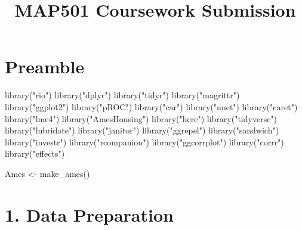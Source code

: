 \documentclass[
]{article}
\title{MAP501 Coursework Submission}
\author{}
\date{\vspace{-2.5em}}
\newenvironment{Shaded}{\begin{snugshade}}{\end{snugshade}}
\newcommand{\FunctionTok}[1]{\textcolor[rgb]{0.00,0.00,0.00}{#1}}
\newcommand{\NormalTok}[1]{#1}
\newcommand{\OtherTok}[1]{\textcolor[rgb]{0.56,0.35,0.01}{#1}}
\newcommand{\StringTok}[1]{\textcolor[rgb]{0.31,0.60,0.02}{#1}}
\begin{document}
\maketitle

{
\setcounter{tocdepth}{2}
\tableofcontents
}
\hypertarget{preamble}{%
\section{Preamble}\label{preamble}}

\begin{Shaded}
\begin{Highlighting}[]
\FunctionTok{library}\NormalTok{(}\StringTok{"rio"}\NormalTok{)}
\FunctionTok{library}\NormalTok{(}\StringTok{"dplyr"}\NormalTok{)}
\FunctionTok{library}\NormalTok{(}\StringTok{"tidyr"}\NormalTok{)}
\FunctionTok{library}\NormalTok{(}\StringTok{"magrittr"}\NormalTok{)}
\FunctionTok{library}\NormalTok{(}\StringTok{"ggplot2"}\NormalTok{)}
\FunctionTok{library}\NormalTok{(}\StringTok{"pROC"}\NormalTok{)}
\FunctionTok{library}\NormalTok{(}\StringTok{"car"}\NormalTok{)}
\FunctionTok{library}\NormalTok{(}\StringTok{"nnet"}\NormalTok{)}
\FunctionTok{library}\NormalTok{(}\StringTok{"caret"}\NormalTok{)}
\FunctionTok{library}\NormalTok{(}\StringTok{"lme4"}\NormalTok{)}
\FunctionTok{library}\NormalTok{(}\StringTok{"AmesHousing"}\NormalTok{)}
\FunctionTok{library}\NormalTok{(}\StringTok{"here"}\NormalTok{) }
\FunctionTok{library}\NormalTok{(}\StringTok{"tidyverse"}\NormalTok{) }
\FunctionTok{library}\NormalTok{(}\StringTok{"lubridate"}\NormalTok{)}
\FunctionTok{library}\NormalTok{(}\StringTok{"janitor"}\NormalTok{)}
\FunctionTok{library}\NormalTok{(}\StringTok{"ggrepel"}\NormalTok{)}
\FunctionTok{library}\NormalTok{(}\StringTok{"sandwich"}\NormalTok{)}
\FunctionTok{library}\NormalTok{(}\StringTok{"investr"}\NormalTok{)}
\FunctionTok{library}\NormalTok{(}\StringTok{"rcompanion"}\NormalTok{)}
\FunctionTok{library}\NormalTok{(}\StringTok{"ggcorrplot"}\NormalTok{)}
\FunctionTok{library}\NormalTok{(}\StringTok{"corrr"}\NormalTok{)}
\FunctionTok{library}\NormalTok{(}\StringTok{"effects"}\NormalTok{)}

\NormalTok{Ames }\OtherTok{\textless{}{-}} \FunctionTok{make\_ames}\NormalTok{()}
\end{Highlighting}
\end{Shaded}

\hypertarget{data-preparation}{%
\section{1. Data Preparation}\label{data-preparation}}
\end{document}
